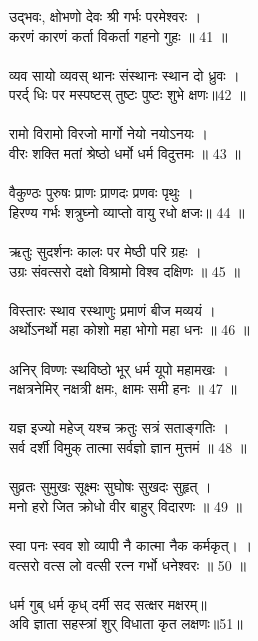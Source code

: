 \subsubsection{}
उद्भवः, क्षोभणो देवः श्री गर्भः परमेश्वरः ।\\
करणं कारणं कर्ता विकर्ता गहनो गुहः ॥ 41 ॥\\
\\
व्यव सायो व्यवस् थानः संस्थानः स्थान दो ध्रुवः ।\\
परर्द् धिः पर मस्पष्टस् तुष्टः पुष्टः शुभे क्षणः॥42 ॥\\
\\
रामो विरामो विरजो मार्गो नेयो नयोऽनयः ।\\
वीरः शक्ति मतां श्रेष्ठो धर्मो धर्म विदुत्तमः ॥ 43 ॥\\
\\
वैकुण्ठः पुरुषः प्राणः प्राणदः प्रणवः पृथुः ।\\
हिरण्य गर्भः शत्रुघ्नो व्याप्तो वायु रधो क्षजः॥ 44 ॥\\
\\
ऋतुः सुदर्शनः कालः पर मेष्ठी परि ग्रहः ।\\
उग्रः संवत्सरो दक्षो विश्रामो विश्व दक्षिणः ॥ 45 ॥\\
\\
विस्तारः स्थाव रस्थाणुः प्रमाणं बीज मव्ययं ।\\
अर्थोऽनर्थो महा कोशो महा भोगो महा धनः ॥ 46 ॥\\
\\
अनिर् विण्णः स्थविष्ठो भूर् धर्म यूपो महामखः ।\\
नक्षत्रनेमिर् नक्षत्री क्षमः, क्षामः समी हनः ॥ 47 ॥\\
\\
यज्ञ इज्यो महेज् यश्च क्रतुः सत्रं सताङ्गतिः ।\\
सर्व दर्शी विमुक् तात्मा सर्वज्ञो ज्ञान मुत्तमं ॥ 48 ॥\\
\\
सुव्रतः सुमुखः सूक्ष्मः सुघोषः सुखदः सुहृत् ।\\
मनो हरो जित क्रोधो वीर बाहुर् विदारणः ॥ 49 ॥\\
\\
स्वा पनः स्वव शो व्यापी नै कात्मा नैक कर्मकृत्। ।\\
वत्सरो वत्स लो वत्सी रत्न गर्भो धनेश्वरः ॥ 50 ॥\\
\\
धर्म गुब् धर्म कृध् दर्मी सद सत्क्षर मक्षरम्॥\\
अवि ज्ञाता सहस्त्रां शुर् विधाता कृत लक्षणः॥51॥\\
\\
